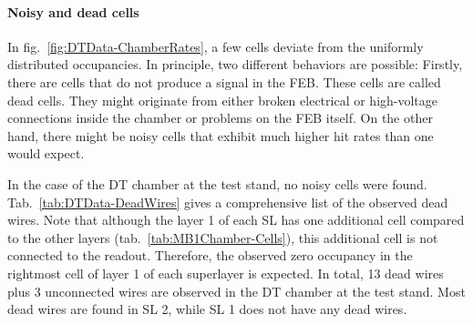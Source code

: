 \paragraph{Noisy and dead cells}
In fig.\ \ref{fig:DTData-ChamberRates}, a few cells deviate from the uniformly distributed occupancies. In principle, two different behaviors are possible: Firstly, there are cells that do not produce a signal in the \ac{FEB}. These cells are called dead cells. They might originate from either broken electrical or high-voltage connections inside the chamber or problems on the \ac{FEB} itself. On the other hand, there might be noisy cells that exhibit much higher hit rates than one would expect.
\par In the case of the \ac{DT} chamber at the test stand, no noisy cells were found. Tab.\ \ref{tab:DTData-DeadWires} gives a comprehensive list of the observed dead wires. Note that although the layer 1 of each \ac{SL} has one additional cell compared to the other layers (tab.\ \ref{tab:MB1Chamber-Cells}), this additional cell is not connected to the readout. Therefore, the observed zero occupancy in the rightmost cell of layer 1 of each superlayer is expected. In total, 13 dead wires plus 3 unconnected wires are observed in the \ac{DT} chamber at the test stand. Most dead wires are found in \ac{SL} 2, while \ac{SL} 1 does not have any dead wires.
